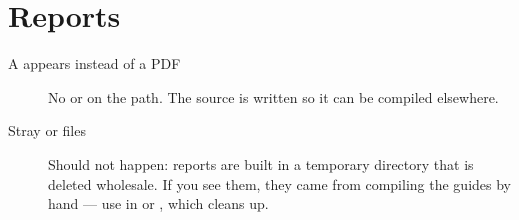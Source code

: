\section{Reports}

\begin{description}
  \item[A  appears instead of a PDF] No  or
     on the path. The source is written so it can be compiled
    elsewhere.
  \item[Stray  or  files] Should not happen: reports are
    built in a temporary directory that is deleted wholesale. If you see them,
    they came from compiling the guides by hand --- use  in
     or , which cleans up.
\end{description}
